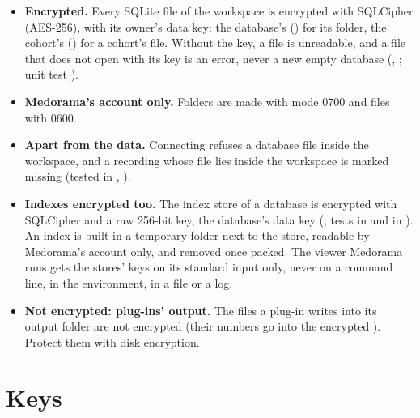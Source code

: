 \begin{itemize}
\item \textbf{Encrypted.} Every SQLite file of the workspace is encrypted with SQLCipher
  (AES-256), with its owner's data key: the database's () for its folder, the
  cohort's () for a cohort's file. Without the key, a file is unreadable, and a
  file that does not open with its key is an error, never a new empty database
  (, ; unit test ).
\item \textbf{Medorama's account only.} Folders are made with mode 0700 and files with 0600.
\item \textbf{Apart from the data.} Connecting refuses a database file inside the workspace, and
  a recording whose file lies inside the workspace is marked missing (tested in
  ,
  ).
\item \textbf{Indexes encrypted too.} The index store of a database is encrypted with SQLCipher
  and a raw 256-bit key, the database's data key (; tests
   in  and
   in
  ). An index is built in a temporary folder next to the store,
  readable by Medorama's account only, and removed once packed. The viewer Medorama runs gets the
  stores' keys on its standard input only, never on a command line, in the environment, in a
  file or a log.
\item \textbf{Not encrypted: plug-ins' output.} The files a plug-in writes into its output folder
  are not encrypted (their numbers go into the encrypted ).
  Protect them with disk encryption.
\end{itemize}

\section{Keys}
\label{sec:protecting-keys}

